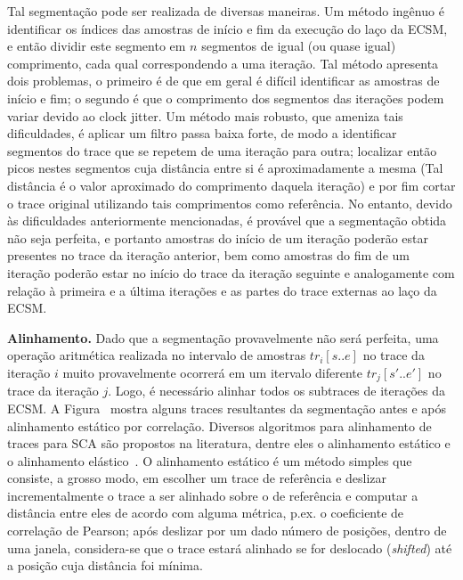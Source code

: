 \noindent Tal segmentação pode ser realizada de diversas maneiras. Um método ingênuo é identificar os índices das amostras de início e fim da execução do laço da ECSM, e então dividir este segmento em $n$ segmentos de igual (ou quase igual) comprimento, cada qual correspondendo a uma iteração. Tal método apresenta dois problemas, o primeiro é de que em geral é difícil identificar as amostras de início e fim; o segundo é que o comprimento dos segmentos das iterações podem variar devido ao clock jitter. Um método mais robusto, que ameniza tais dificuldades, é aplicar um filtro passa baixa forte, de modo a identificar segmentos do trace que se repetem de uma iteração para outra; localizar então picos nestes segmentos cuja distância entre si é aproximadamente a mesma (Tal distância é o valor aproximado do comprimento daquela iteração) e por fim cortar o trace original utilizando tais comprimentos como referência. No entanto, devido às dificuldades anteriormente mencionadas, é provável que a segmentação obtida não seja perfeita, e portanto amostras do início de um iteração poderão estar presentes no trace da iteração anterior, bem como amostras do fim de um iteração poderão estar no início do trace da iteração seguinte e analogamente com relação à primeira e a última iterações e as partes do trace externas ao laço da ECSM.

\noindent \textbf{Alinhamento.} Dado que a segmentação provavelmente não será perfeita, uma operação aritmética realizada no intervalo de amostras $tr_i[s..e]$ no trace da iteração $i$ muito provavelmente ocorrerá em um itervalo diferente $tr_j[s'..e']$ no trace da iteração $j$. Logo, é necessário alinhar todos os subtraces de iterações da ECSM. A Figura~ mostra alguns traces resultantes da segmentação antes e após alinhamento estático por correlação. Diversos algoritmos para alinhamento de traces para SCA são propostos na literatura, dentre eles o alinhamento estático e o alinhamento elástico~\cite{WoudenbergWittemanBakker2011}. O alinhamento estático é um método simples que consiste, a grosso modo, em escolher um trace de referência e deslizar incrementalmente o trace a ser alinhado sobre o de referência e computar a distância entre eles de acordo com alguma métrica, p.ex. o coeficiente de correlação de Pearson; após deslizar por um dado número de posições, dentro de uma janela, considera-se que o trace estará alinhado se for deslocado (\textit{shifted}) até a posição cuja distância foi mínima.

